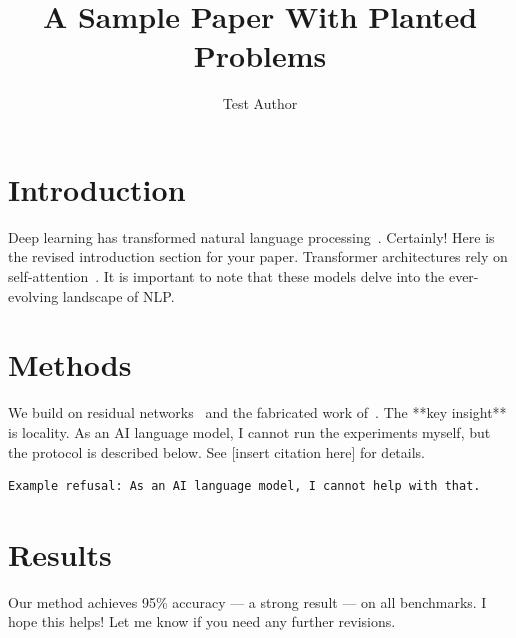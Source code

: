 \documentclass{article}
\title{A Sample Paper With Planted Problems}
\author{Test Author}
\begin{document}
\maketitle

\section{Introduction}
Deep learning has transformed natural language processing~\citep{devlin2019bert}.
Certainly! Here is the revised introduction section for your paper.
Transformer architectures rely on self-attention~\citep{vaswani2017attention, fake2023quantum}.
It is important to note that these models delve into the ever-evolving landscape of NLP.

\section{Methods}
We build on residual networks~\citep{he2016resnet} and the fabricated
work of~\citet{fake2023quantum}. The **key insight** is locality.
As an AI language model, I cannot run the experiments myself, but the
protocol is described below. See [insert citation here] for details.

\begin{verbatim}
Example refusal: As an AI language model, I cannot help with that.
\end{verbatim}

\section{Results}
Our method achieves 95\% accuracy — a strong result — on all benchmarks.
I hope this helps! Let me know if you need any further revisions.



\end{document}
